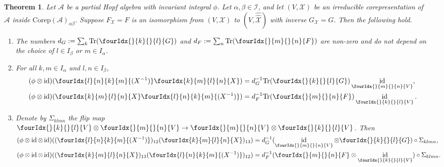 \documentclass[10pt]{article}
\DeclareMathOperator{\id}{id}
\newcommand{\Corep}{\mathrm{Corep}}
\newcommand{\Tr}{\mathrm{Tr}}
\newcommand{\Gr}[5]{\fourIdx{#2}{#4}{#3}{#5}{#1}}%
\newcommand{\Gru}[3]{\Gr{#1}{}{}{#2}{#3}}
\newtheorem{Theorem}{Theorem}[section]
\theoremstyle{definition}
\numberwithin{equation}{section}
\begin{document}

\begin{Theorem} \label{thm:rep-orthogonality} Let $\mathscr{A}$ be a
 partial Hopf algebra with invariant integral $\phi$. Let $\alpha,\beta\in \mathscr{I}$, and let $(V,\mathscr{X})$
  be an irreducible corepresentation of $\mathscr{A}$ inside $\Corep(\mathscr{A})_{\alpha\beta}$. Suppose
  $F_{\mathscr{X}}=F$ is an isomorphism from $(V,\mathscr{X})$ to
  $(V,\hat{\hat{\mathscr{X}}})$ with inverse
  $G_{\mathscr{X}}= G$. Then the following hold.
  \begin{enumerate}[label=(\arabic*)]
  \item The numbers $d_G:=\sum_{k} \Tr (\Gru{G}{k}{l})$ and $d_F:=\sum_{n} \Tr (\Gru{F}{m}{n})$ are non-zero and do not depend on the choice of $l \in I_\beta$ or $m\in I_\alpha$.
    \item  For all $k,m \in I_\alpha$ and $l,n\in I_\beta$,
    \begin{align*}
      (\phi \otimes \id)(\Gr{(X^{-1})}{l}{k}{n}{m}\Gr{X}{k}{l}{m}{n})
      &=d_G^{-1}\Tr(\Gru{G}{k}{l})
      \id_{\Gru{V}{m}{n}}, \\
      (\phi \otimes \id)(\Gr{X}{k}{l}{m}{n}\Gr{(X^{-1})}{l}{k}{n}{m})
      &=d_F^{-1}\Tr(\Gru{F}{m}{n})
      \id_{\Gru{V}{k}{l}}.
    \end{align*}
  \item Denote by $\Sigma_{klmn}$ the flip map $\Gru{V}{k}{l}
    \otimes \Gru{V}{m}{n} \to \Gru{V}{m}{n}
    \otimes \Gru{V}{k}{l}$. Then
 \begin{align*}
   (\phi \otimes \id \otimes
   \id)((\Gr{(X^{-1})}{l}{k}{n}{m})_{12}(\Gr{X}{k}{l}{m}{n})_{13}) &=
   d_G^{-1}
   (\id_{\Gru{V}{m}{n}} \otimes \Gru{G}{k}{l})
   \circ \Sigma_{klmn}, \\
   (\phi \otimes \id \otimes
   \id)((\Gr{X}{k}{l}{m}{n})_{13}(\Gr{(X^{-1})}{l}{k}{n}{m})_{12}) &= d_F^{-1} (\Gru{F}{m}{n}
   \otimes \id_{\Gru{V}{k}{l}}) \circ \Sigma_{klmn}.
 \end{align*}
\end{enumerate}
  \end{Theorem}
\end{document}
